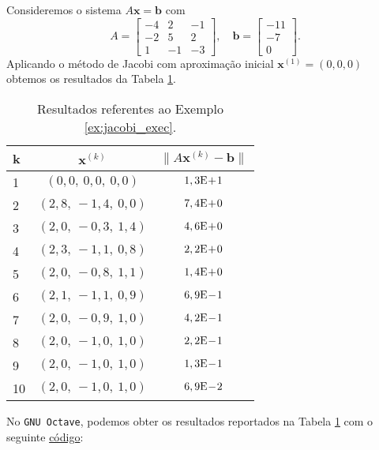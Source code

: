 \begin{ex}\label{ex:jacobi_exec}
  Consideremos o sistema $A\pmb{x} = \pmb{b}$ com
  \begin{equation}
    A =
    \begin{bmatrix}
      -4 & 2 & -1 \\
      -2 & 5 & 2 \\
       1 & -1 & -3
    \end{bmatrix},\quad
    \pmb{b} =
    \begin{bmatrix}
      -11\\ -7\\ 0
    \end{bmatrix}.
  \end{equation}
  Aplicando o método de Jacobi com aproximação inicial $\pmb{x}^{(1)} = (0, 0, 0)$ obtemos os resultados da Tabela \ref{tab:ex_jacobi_exec}.

  \begin{table}[h!]
    \centering
    \begin{tabular}{l|cc}
      k & $\pmb{x}^{(k)}$ & $\|A\pmb{x}^{(k)}-\pmb{b}\|$\\\hline
      1 & $(0,0,~0,0,~0,0)$ & $1,3\mathrm{E}\!+\!1$\\
      2 & $(2,8,~-1,4,~0,0)$ & $7,4\mathrm{E}\!+\!0$ \\
      3 & $(2,0,~-0,3,~1,4)$ & $4,6\mathrm{E}\!+\!0$ \\
      4 & $(2,3,~-1,1,~0,8)$ & $2,2\mathrm{E}\!+\!0$ \\
      5 & $(2,0,~-0,8,~1,1)$ & $1,4\mathrm{E}\!+\!0$ \\
      6 & $(2,1,~-1,1,~0,9)$ & $6,9\mathrm{E}\!-\!1$ \\
      7 & $(2,0,~-0,9,~1,0)$ & $4,2\mathrm{E}\!-\!1$ \\
      8 & $(2,0,~-1,0,~1,0)$ & $2,2\mathrm{E}\!-\!1$ \\
      9 & $(2,0,~-1,0,~1,0)$ & $1,3\mathrm{E}\!-\!1$ \\
      10 & $(2,0,~-1,0,~1,0)$ & $6,9\mathrm{E}\!-\!2$ \\\hline
    \end{tabular}
    \caption{Resultados referentes ao Exemplo \ref{ex:jacobi_exec}.}
    \label{tab:ex_jacobi_exec}
  \end{table}

\ifisoctave
No \verb+GNU Octave+, podemos obter os resultados reportados na Tabela \ref{tab:ex_jacobi_exec} com o seguinte \href{https://github.com/phkonzen/notas/blob/master/src/MatematicaNumerica/cap_sl_iter/dados/ex_jacobi_exec/ex_jacobi_exec.m}{código}:

\fi
\end{ex}

